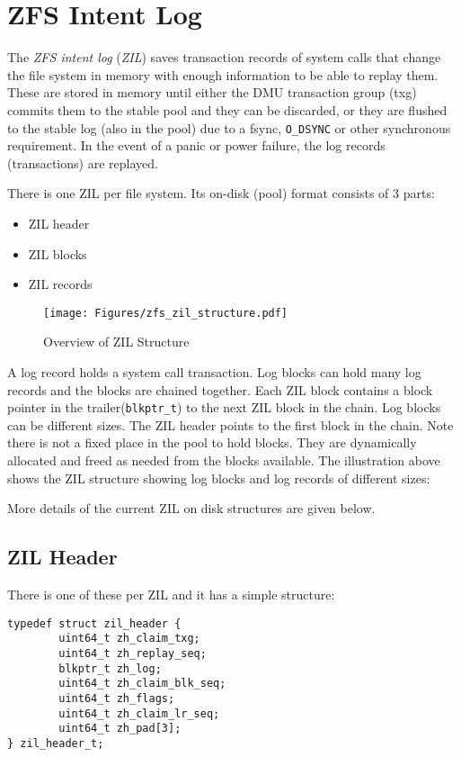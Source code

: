 \chapter{ZFS Intent Log}\label{chap:zil}

The \emph{ZFS intent log} (\emph{ZIL}) saves transaction records of system calls
that change the file system in memory with enough information
to be able to replay them.
These are stored in memory until
either the DMU transaction group (txg) commits them
to the stable pool and they can be discarded,
or they are flushed to the stable log (also in the pool)
due to a fsync, \lstinline{O_DSYNC} or other synchronous requirement.
In the event of a panic or power failure,
the log records (transactions) are replayed.

There is one ZIL per file system. Its on-disk (pool) format consists of 3 parts:

\begin{itemize}
\item ZIL header
\item ZIL blocks
\item ZIL records
\end{itemize}

\begin{figure}[ht!]
  \centering
  \texttt{[image: Figures/zfs\_zil\_structure.pdf]}
  \caption{Overview of ZIL Structure}
  \label{fig:zil_structure}
\end{figure}

A log record holds a system call transaction.
Log blocks can hold many log records and the blocks are chained together.
Each ZIL block contains a block pointer in the trailer(\lstinline{blkptr_t})
to the next ZIL block in the chain.
Log blocks can be different sizes.
The ZIL header points to the first block in the chain.
Note there is not a fixed place in the pool to hold blocks.
They are dynamically allocated and freed as needed from the blocks available.
The illustration above shows the ZIL structure
showing log blocks and log records of different sizes:

More details of the current ZIL on disk structures are given below.

\section{ZIL Header}
There is one of these per ZIL and it has a simple structure:

\begin{lstlisting}[style=c]
typedef struct zil_header {
        uint64_t zh_claim_txg;
        uint64_t zh_replay_seq;
        blkptr_t zh_log;
        uint64_t zh_claim_blk_seq;
        uint64_t zh_flags;
        uint64_t zh_claim_lr_seq;
        uint64_t zh_pad[3];
} zil_header_t;
\end{lstlisting}

